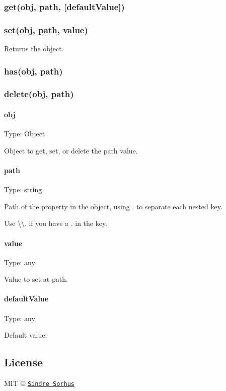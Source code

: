 \subsubsection*{get(obj, path, \mbox{[}default\+Value\mbox{]})}

\subsubsection*{set(obj, path, value)}

Returns the object.

\subsubsection*{has(obj, path)}

\subsubsection*{delete(obj, path)}

\paragraph*{obj}

Type\+: {\ttfamily Object}

Object to get, set, or delete the {\ttfamily path} value.

\paragraph*{path}

Type\+: {\ttfamily string}

Path of the property in the object, using {\ttfamily .} to separate each nested key.

Use {\ttfamily \textbackslash{}\textbackslash{}.} if you have a {\ttfamily .} in the key.

\paragraph*{value}

Type\+: {\ttfamily any}

Value to set at {\ttfamily path}.

\paragraph*{default\+Value}

Type\+: {\ttfamily any}

Default value.

\subsection*{License}

M\+IT © \href{https://sindresorhus.com}{\tt Sindre Sorhus} 
